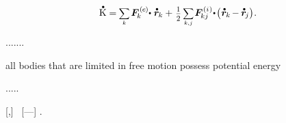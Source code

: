 \nopagebreak\vspace{-0.3em}
\begin{equation}\label{thebalanceofkineticenergy.finally}
\mathdotabove{\kineticenergyinmechanics} \hspace{.1ex}
= \hspace{-0.1ex}
\scalebox{.8}{$ \displaystyle \sum_{\smash{k}} $} \hspace{.3ex}
\bm{F}^{\smthexternal}_{\hspace{-0.16ex}k} \hspace{-0.4ex} \dotp \hspace{.1ex} \mathdotabove{\locationvector}_{\hspace{-0.1ex}k}
+ \hspace{.2ex}
\smalldisplaystyleonehalf \hspace{.3ex} \scalebox{.8}{$ \displaystyle \sum_{\smash{k,\hspace{.1ex}j}} $}
\hspace{.2ex} \bm{F}^{\smthinternal}_{\hspace{-0.16ex}kj} \hspace{-0.3ex} \dotp \hspace{-0.3ex}
\bigl( \hspace{.1ex} \mathdotabove{\locationvector}_{\hspace{-0.1ex}k}
\hspace{-0.2ex} - \hspace{-0.1ex}
\mathdotabove{\locationvector}_{\hspace{-0.2ex}j} \bigr)
\hspace{.1ex} .
\end{equation}

.......

all bodies that are limited in free motion possess potential energy

.....

\newpage



\begin{changemargin}{.4\textwidth}{\parindent}
\vspace{-1em}
{\noindent\small
\setlength{\parskip}{\spacebetweenparagraphs}

[,]
~[---]
.

\par}
\vspace{.4em}
\end{changemargin}

